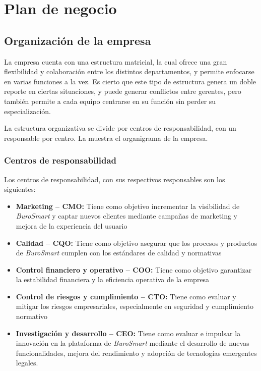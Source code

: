 \section{Plan de negocio}

\subsection{Organización de la empresa}
La empresa cuenta con una estructura matricial, la cual ofrece una gran flexibilidad y colaboración entre los distintos departamentos, y permite enfocarse en varias funciones a la vez. Es cierto que este tipo de estructura genera un doble reporte en ciertas situaciones, y puede generar conflictos entre gerentes, pero también permite a cada equipo centrarse en su función sin perder su especialización.

La estructura organizativa se divide por centros de responsabilidad, con un responsable por centro. La  muestra el organigrama de la empresa.



\subsubsection{Centros de responsabilidad}
Los centros de responsabilidad, con sus respectivos responsables son los siguientes:
\begin{itemize}
  \item \textbf{Marketing -- CMO:} Tiene como objetivo incrementar la visibilidad de \textit{BuroSmart} y captar nuevos clientes mediante campañas de marketing y mejora de la experiencia del usuario
  \item \textbf{Calidad -- CQO:} Tiene como objetivo asegurar que los procesos y productos de \textit{BuroSmart} cumplen con los estándares de calidad y normativas
  \item \textbf{Control financiero y operativo -- COO:} Tiene como objetivo garantizar la estabilidad financiera y la eficiencia operativa de la empresa
  \item \textbf{Control de riesgos y cumplimiento -- CTO:} Tiene como evaluar y mitigar los riesgos empresariales, especialmente en seguridad y cumplimiento normativo
  \item \textbf{Investigación y desarrollo -- CEO:} Tiene como evaluar e impulsar la innovación en la plataforma de \textit{BuroSmart} mediante el desarrollo de nuevas funcionalidades, mejora del rendimiento y adopción de tecnologías emergentes
legales.
\end{itemize}


